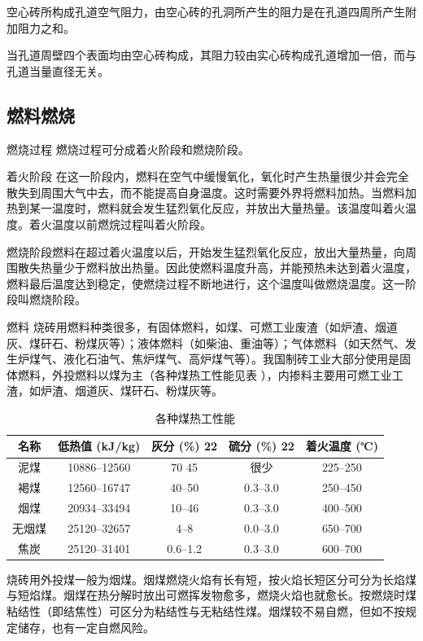 \documentclass{ctexbook}
\begin{document}
空心砖所构成孔道空气阻力，由空心砖的孔洞所产生的阻力是在孔道四周所产生附加阻力之和。

当孔道周壁四个表面均由空心砖构成，其阻力较由实心砖构成孔道增加一倍，而与孔道当量直径无关。
\subsection{燃料燃烧}
燃烧过程 燃烧过程可分成着火阶段和燃烧阶段。

着火阶段 在这一阶段内，燃料在空气中缓慢氧化，氧化时产生热量很少并会完全散失到周围大气中去，而不能提高自身温度。这时需要外界将燃料加热。当燃料加热到某一温度时，燃料就会发生猛烈氧化反应，并放出大量热量。该温度叫着火温度。着火温度以前燃烷过程叫着火阶段。

燃烧阶段燃料在超过着火温度以后，开始发生猛烈氧化反应，放出大量热量，向周围散失热量少于燃料放出热量。因此使燃料温度升高，并能预热未达到着火温度，燃料最后温度达到稳定，使燃烧过程不断地进行，这个温度叫做燃烧温度。这一阶段叫燃烧阶段。

燃料 烧砖用燃料种类很多，有固体燃料，如煤、可燃工业废渣（如炉渣、烟道灰、煤矸石、粉煤灰等）；液体燃料（如柴油、重油等）；气体燃料（如天然气、发生炉煤气、液化石油气、焦炉煤气、高炉煤气等）。我国制砖工业大部分使用是固体燃料，外投燃料以煤为主（各种煤热工性能见表 ），内掺料主要用可燃工业工渣，如炉渣、烟道灰、煤矸石、粉煤灰等。

\begin{table}[htbp]
	\centering
	\caption{各种煤热工性能}
	\begin{tabular}{c|c|c|c|c}
		\hline
		名称  &低热值 (kJ/kg)& 灰分 (\%) 22& 硫分 (\%) 22& 着火温度 (℃)\\ \hline
		泥煤  &10886--12560&70 45   &很少    &225--250\\ \hline
		褐煤  &12560--16747&40--50  &0.3--3.0&250--450\\ \hline
		烟煤&20934--33494  &10--46  &0.3--3.0&400--500\\ \hline
		无烟煤&25120--32657&4--8    &0.0--3.0&650--700\\ \hline
		焦炭  &25120--31401&0.6--1.2&0.3--3.0&600--700\\ \hline
	\end{tabular}%
	\label{tab:meiregong}%
\end{table}%
烧砖用外投煤一般为烟煤。烟煤燃烧火焰有长有短，按火焰长短区分可分为长焰煤与短焰煤。烟煤在热分解时放出可燃挥发物愈多，燃烧火焰也就愈长。按燃烧时煤粘结性（即结焦性）可区分为粘结性与无粘结性煤。烟煤较不易自燃，但如不按规定储存，也有一定自燃风险。
\end{document}

